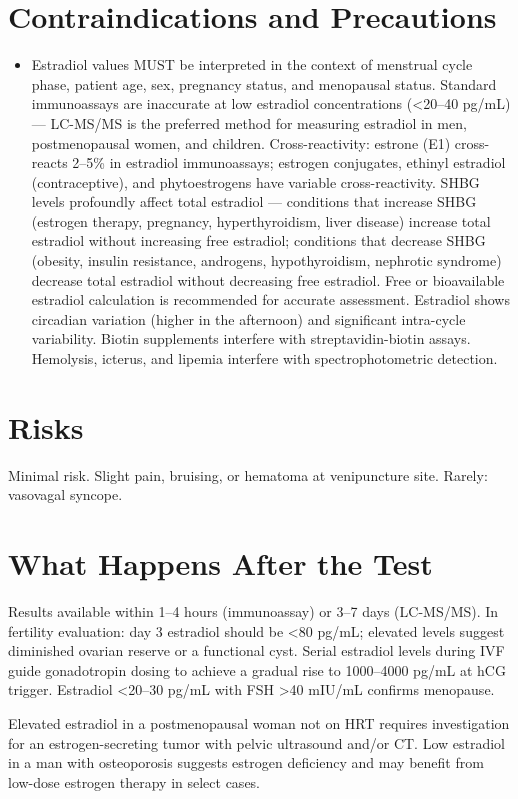 \section*{Contraindications and Precautions}
\begin{itemize}
  \item Estradiol values MUST be interpreted in the context of menstrual cycle phase, patient age, sex, pregnancy status, and menopausal status. Standard immunoassays are inaccurate at low estradiol concentrations (<20--40 pg/mL) --- LC-MS/MS is the preferred method for measuring estradiol in men, postmenopausal women, and children. Cross-reactivity: estrone (E1) cross-reacts 2--5\% in estradiol immunoassays; estrogen conjugates, ethinyl estradiol (contraceptive), and phytoestrogens have variable cross-reactivity. SHBG levels profoundly affect total estradiol --- conditions that increase SHBG (estrogen therapy, pregnancy, hyperthyroidism, liver disease) increase total estradiol without increasing free estradiol; conditions that decrease SHBG (obesity, insulin resistance, androgens, hypothyroidism, nephrotic syndrome) decrease total estradiol without decreasing free estradiol. Free or bioavailable estradiol calculation is recommended for accurate assessment. Estradiol shows circadian variation (higher in the afternoon) and significant intra-cycle variability. Biotin supplements interfere with streptavidin-biotin assays. Hemolysis, icterus, and lipemia interfere with spectrophotometric detection.
\end{itemize}
\section*{Risks}
Minimal risk. Slight pain, bruising, or hematoma at venipuncture site. Rarely: vasovagal syncope.

\section*{What Happens After the Test}
Results available within 1--4 hours (immunoassay) or 3--7 days (LC-MS/MS). In fertility evaluation: day 3 estradiol should be <80 pg/mL; elevated levels suggest diminished ovarian reserve or a functional cyst. Serial estradiol levels during IVF guide gonadotropin dosing to achieve a gradual rise to 1000--4000 pg/mL at hCG trigger. Estradiol <20--30 pg/mL with FSH >40 mIU/mL confirms menopause.

Elevated estradiol in a postmenopausal woman not on HRT requires investigation for an estrogen-secreting tumor with pelvic ultrasound and/or CT. Low estradiol in a man with osteoporosis suggests estrogen deficiency and may benefit from low-dose estrogen therapy in select cases.

